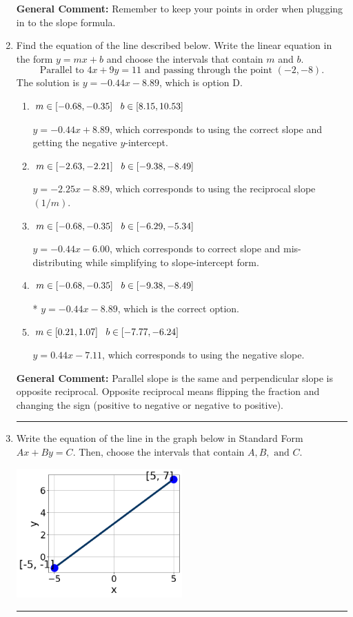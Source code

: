 \documentclass{extbook}[14pt]
\newcommand{\litem}[1]{\item #1

\rule{\textwidth}{0.4pt}}
\begin{document}
\begin{enumerate}
{\textbf{General Comment:} Remember to keep your points in order when plugging in to the slope formula.
}
\litem{
Find the equation of the line described below. Write the linear equation in the form $ y=mx+b $ and choose the intervals that contain $m$ and $b$.
\[ \text{Parallel to } 4 x + 9 y = 11 \text{ and passing through the point } (-2, -8). \]The solution is \( y = -0.44x - 8.89 \), which is option D.\begin{enumerate}[label=\Alph*.]
\item \( m \in [-0.68, -0.35] \hspace*{3mm} b \in [8.15, 10.53] \)

 $y = -0.44x + 8.89$, which corresponds to using the correct slope and getting the negative $y$-intercept.
\item \( m \in [-2.63, -2.21] \hspace*{3mm} b \in [-9.38, -8.49] \)

 $y = -2.25x - 8.89$, which corresponds to using the reciprocal slope $(1/m)$.
\item \( m \in [-0.68, -0.35] \hspace*{3mm} b \in [-6.29, -5.34] \)

 $y = -0.44x - 6.00$, which corresponds to correct slope and mis-distributing while simplifying to slope-intercept form.
\item \( m \in [-0.68, -0.35] \hspace*{3mm} b \in [-9.38, -8.49] \)

* $y = -0.44x - 8.89$, which is the correct option.
\item \( m \in [0.21, 1.07] \hspace*{3mm} b \in [-7.77, -6.24] \)

 $y = 0.44x - 7.11$, which corresponds to using the negative slope.
\end{enumerate}

\textbf{General Comment:} Parallel slope is the same and perpendicular slope is opposite reciprocal. Opposite reciprocal means flipping the fraction and changing the sign (positive to negative or negative to positive).
}
\litem{
Write the equation of the line in the graph below in Standard Form $Ax+By=C$. Then, choose the intervals that contain $A, B, \text{ and } C$.

\begin{center}
    \includegraphics[width=0.5\textwidth]{../Figures/linearGraphToStandardB.png}
\end{center}


}
\end{enumerate}
\end{document}
